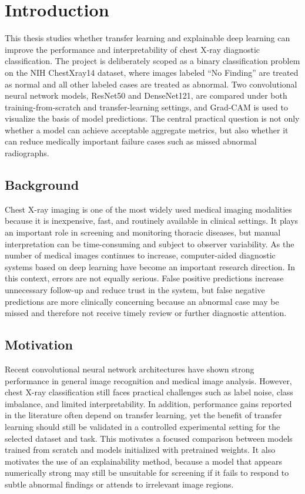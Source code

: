 \chapter{Introduction}

This thesis studies whether transfer learning and explainable deep learning can improve the performance and interpretability of chest X-ray diagnostic classification. The project is deliberately scoped as a binary classification problem on the NIH ChestXray14 dataset, where images labeled ``No Finding'' are treated as normal and all other labeled cases are treated as abnormal. Two convolutional neural network models, ResNet50 and DenseNet121, are compared under both training-from-scratch and transfer-learning settings, and Grad-CAM is used to visualize the basis of model predictions. The central practical question is not only whether a model can achieve acceptable aggregate metrics, but also whether it can reduce medically important failure cases such as missed abnormal radiographs.

\section{Background}
Chest X-ray imaging is one of the most widely used medical imaging modalities because it is inexpensive, fast, and routinely available in clinical settings. It plays an important role in screening and monitoring thoracic diseases, but manual interpretation can be time-consuming and subject to observer variability. As the number of medical images continues to increase, computer-aided diagnostic systems based on deep learning have become an important research direction. In this context, errors are not equally serious. False positive predictions increase unnecessary follow-up and reduce trust in the system, but false negative predictions are more clinically concerning because an abnormal case may be missed and therefore not receive timely review or further diagnostic attention.

\section{Motivation}
Recent convolutional neural network architectures have shown strong performance in general image recognition and medical image analysis. However, chest X-ray classification still faces practical challenges such as label noise, class imbalance, and limited interpretability. In addition, performance gains reported in the literature often depend on transfer learning, yet the benefit of transfer learning should still be validated in a controlled experimental setting for the selected dataset and task. This motivates a focused comparison between models trained from scratch and models initialized with pretrained weights. It also motivates the use of an explainability method, because a model that appears numerically strong may still be unsuitable for screening if it fails to respond to subtle abnormal findings or attends to irrelevant image regions.

